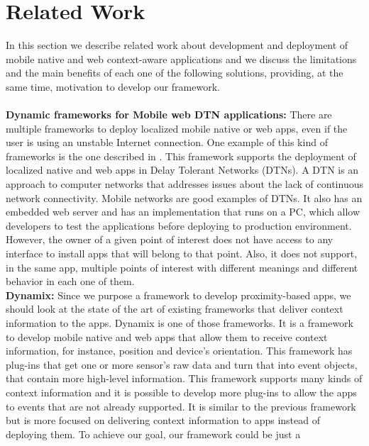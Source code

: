 
%
%

\section{Related Work}
\label{sec:related_work}
In this section we describe related work about
development and deployment of mobile native and web 
context-aware applications and we discuss the 
limitations and the main benefits of each one of
the following solutions, providing, at the same time,
motivation to develop our framework.\\ \\
\textbf{Dynamic frameworks for Mobile web DTN applications:}
There are multiple frameworks to deploy localized
mobile native or web apps, even if the user is using an
unstable Internet connection. One example of this
kind of frameworks is the one
described in \cite{Sankaran2014}.
This framework supports the deployment of localized 
native and
web apps in Delay Tolerant Networks (DTNs).
A DTN is an approach to computer networks that 
addresses issues about the lack of continuous network
connectivity. Mobile networks are good examples of DTNs. 
It also has an embedded web server 
and has an implementation that runs on a PC, which allow
developers to test the applications before deploying
to production environment.
However, the owner of a given point of interest does not
have access to any interface to install apps that will
belong to that point. Also, it does not support, in the
same app, multiple points of interest with different
meanings and different behavior in each one of them. \\
\textbf{Dynamix:}
Since we purpose a framework to develop
proximity-based apps, we should look at the state
of the art of existing frameworks that deliver
context information to the apps.
Dynamix \cite{Carlson2012} is one of those frameworks.
It is a framework to develop
mobile native and web apps that allow them to receive
context information, for instance, position and device's
orientation. This framework has plug-ins that get
one or more sensor's raw data and turn that into event
objects, that contain more high-level information.
This framework supports many kinds of context information
and it is possible to develop more plug-ins to allow the
apps to events that are not
already supported. It is similar to the previous
framework but is more focused on delivering context
information to apps instead of deploying them.
To achieve our goal, our framework could be just a
